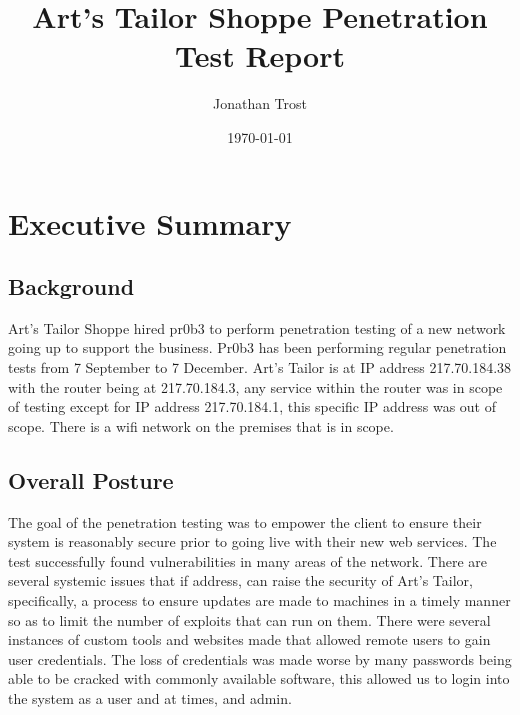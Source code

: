 \documentclass[notitlepage]{article}
\begin{document}
	
	
	\title{Art's Tailor Shoppe Penetration Test Report}
	\author{Jonathan Trost}
	\date{\isodate\today}
	
	\maketitle
	
	\tableofcontents
	
	\newpage
	\section{Executive Summary}

	\subsection{Background}
		\indent \indent Art's Tailor Shoppe hired pr0b3 to perform penetration testing of a new network going up to support the business.  Pr0b3 has been performing regular penetration tests from 7 September to 7 December. Art's Tailor is at IP address 217.70.184.38 with the router being at 217.70.184.3, any service within the router was in scope of testing except for IP address 217.70.184.1, this specific IP address was out of scope. There is a wifi network on the premises that is in scope.  \\
	\subsection{Overall Posture}
		\indent \indent The goal of the penetration testing was to empower the client to ensure their system is reasonably secure prior to going live with their new web services. The test successfully found vulnerabilities in many areas of the network.  There are several systemic issues that if address, can raise the security of Art's Tailor, specifically, a process to ensure updates are made to machines in a timely manner so as to limit the number of exploits that can run on them.  There were several instances of custom tools and websites made that allowed remote users to gain user credentials. The loss of credentials was made worse by many passwords being able to be cracked with commonly available software, this allowed us to login into the system as a user and at times, and admin. \\ 
	
\end{document}
